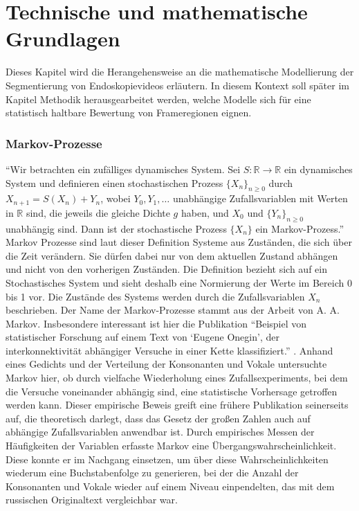 \section{Technische und mathematische Grundlagen}

Dieses Kapitel wird die Herangehensweise an die mathematische Modellierung der Segmentierung von Endoskopievideos erläutern.
In diesem Kontext soll später im Kapitel Methodik herausgearbeitet werden, welche Modelle sich für eine statistisch haltbare Bewertung von Frameregionen eignen.

\subsubsection{Markov-Prozesse}

\enquote{Wir betrachten ein zufälliges dynamisches System. Sei $S : \mathbb{R} \to \mathbb{R}$ ein dynamisches System und definieren einen stochastischen Prozess $\{X_n\}_{n \ge 0}$ durch $X_{n+1} = S(X_n) + Y_n$, wobei $Y_0, Y_1, \dots$ unabhängige Zufallsvariablen mit Werten in $\mathbb{R}$ sind, die jeweils die gleiche Dichte $g$ haben, und $X_0$ und $\{Y_n\}_{n \ge 0}$ unabhängig sind. Dann ist der stochastische Prozess $\{X_n\}$ ein Markov-Prozess.} \citep[S.~13]{KhalilGhaffari2023}
Markov Prozesse sind laut dieser Definition Systeme aus Zuständen, die sich über die Zeit verändern.
Sie dürfen dabei nur von dem aktuellen Zustand abhängen und nicht von den vorherigen Zuständen.
Die Definition bezieht sich auf ein Stochastisches System und sieht deshalb eine Normierung der Werte im Bereich 0 bis 1 vor.
Die Zustände des Systems werden durch die Zufallsvariablen $X_n$ beschrieben.
\newline
Der Name der Markov-Prozesse stammt aus der Arbeit von A. A. Markov. Insbesondere interessant ist hier die Publikation \enquote{Beispiel von statistischer Forschung auf einem Text von \enquote{Eugene Onegin}, der interkonnektivität abhängiger Versuche in einer Kette klassifiziert.} \citep{markov-1913}.
Anhand eines Gedichts und der Verteilung der Konsonanten und Vokale untersuchte Markov hier, ob durch vielfache Wiederholung eines Zufallsexperiments, bei dem die Versuche voneinander abhängig sind, eine statistische Vorhersage getroffen werden kann. Dieser empirische Beweis greift eine frühere Publikation seinerseits auf, die theoretisch darlegt, dass das Gesetz der großen Zahlen auch auf abhängige
Zufallsvariablen anwendbar ist. Durch empirisches Messen der Häufigkeiten der Variablen erfasste Markov eine Übergangswahrscheinlichkeit. Diese konnte er im Nachgang einsetzen, um über diese Wahrscheinlichkeiten wiederum eine Buchstabenfolge zu generieren, bei der die Anzahl der Konsonanten und Vokale wieder auf einem Niveau einpendelten, das mit dem russischen Originaltext vergleichbar war.
